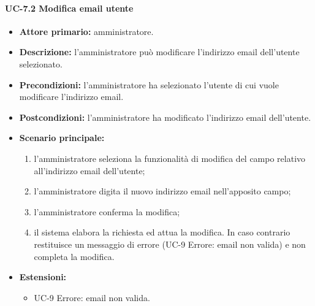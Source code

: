     \paragraph{UC-7.2 Modifica email utente}
    \begin{itemize}
        \item \textbf{Attore primario:} amministratore.
    
        \item \textbf{Descrizione:} l'amministratore può modificare l'indirizzo email dell'utente selezionato.
        
        \item \textbf{Precondizioni:} l'amministratore ha selezionato l'utente di cui vuole modificare l'indirizzo email.
    
        \item \textbf{Postcondizioni:} l'amministratore ha modificato l'indirizzo email dell'utente.
    
        \item \textbf{Scenario principale:}
        \begin{enumerate}
            \item  l'amministratore seleziona la funzionalità di modifica del campo relativo all'indirizzo email dell'utente;
            \item l'amministratore digita il nuovo indirizzo email nell'apposito campo;
            \item l'amministratore conferma la modifica;
            \item il sistema elabora la richiesta ed attua la modifica. In caso contrario restituisce un messaggio di errore (UC-9 Errore: email non valida) e non completa la modifica.
        \end{enumerate}
        \item \textbf{Estensioni:}
              \begin{itemize}
                    \item UC-9 Errore: email non valida.
            \end{itemize}
    \end{itemize}


